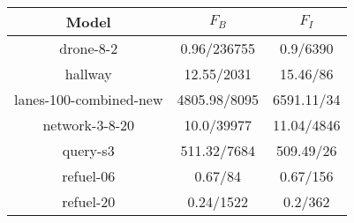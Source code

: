 \documentclass{article}
\begin{document}
\begin{table}
\begin{tabular}{|c|c|c|}
\hline

Model & $F_{B}$ & $F_{I}$ \\ \hline 

drone-8-2 & 0.96/236755 & 0.9/6390 \\
\hline
hallway & 12.55/2031 & 15.46/86 \\
\hline
lanes-100-combined-new & 4805.98/8095 & 6591.11/34 \\
\hline
network-3-8-20 & 10.0/39977 & 11.04/4846 \\
\hline
query-s3 & 511.32/7684 & 509.49/26 \\
\hline
refuel-06 & 0.67/84 & 0.67/156 \\
\hline
refuel-20 & 0.24/1522 & 0.2/362 \\
\hline
\end{tabular}
\end{table}
\end{document}
